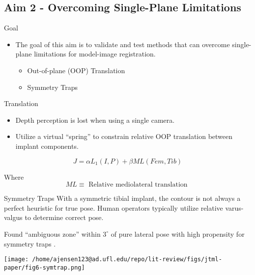 \documentclass[presentation, aspectratio=1610]{beamer}
\begin{document}
\subsection{Aim 2 - Overcoming Single-Plane Limitations}
\label{sec:org73a4772}
\begin{frame}[label={sec:orgeb6bc01}]{Goal}
\begin{itemize}
\item The goal of this aim is to validate and test methods that can overcome single-plane limitations for model-image registration.
\begin{itemize}
\item Out-of-plane (OOP) Translation
\item Symmetry Traps
\end{itemize}
\end{itemize}
\end{frame}
\begin{frame}[label={sec:org2b445ce}]{Translation}
\begin{itemize}
\item Depth perception is lost when using a single camera.
\item Utilize a virtual ``spring'' to constrain relative OOP translation between implant components.
\end{itemize}

\begin{equation*}
  J = \alpha L_{1}(I,P) + \beta ML(Fem,Tib)
\end{equation*}

Where
\begin{equation*}
  ML \equiv \text{ Relative mediolateral translation }
\end{equation*}
\end{frame}
\begin{frame}[label={sec:org245a49f}]{Symmetry Traps}
With a symmetric tibial implant, the contour is not always a perfect heuristic for true pose. Human operators typically utilize relative varus-valgus to determine correct pose.

Found ``ambiguous zone'' within \(3^{\circ}\) of pure lateral pose with high propensity for symmetry traps \autocite{jensenJointTrackMachine2022}.

\begin{center}
\texttt{[image: /home/ajensen123@ad.ufl.edu/repo/lit-review/figs/jtml-paper/fig6-symtrap.png]}
\end{center}
\end{frame}
\end{document}
